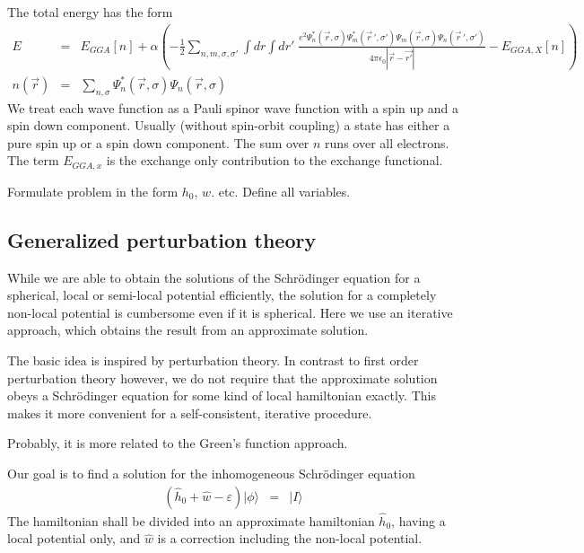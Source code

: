 \documentclass[11pt,a4paper]{report}
\begin{document}
The total energy has the form
\begin{eqnarray*}
E&=&E_{GGA}[n]+\alpha\left(-\frac{1}{2}\sum_{n,m,\sigma,\sigma'}
\int dr\int dr'\;
\frac{e^2\Psi^*_n(\vec{r},\sigma)\Psi^*_m(\vec{r}\,',\sigma')
\Psi_m(\vec{r},\sigma)\Psi_n(\vec{r}\,',\sigma')}{4\pi\epsilon_0|\vec{r}-\vec{r'}|}
-E_{GGA,X}[n]\right)
\\
n(\vec{r})&=&\sum_{n,\sigma}\Psi_n^*(\vec{r},\sigma)\Psi_n(\vec{r},\sigma)
\end{eqnarray*}
We treat each wave function as a Pauli spinor wave function
with a spin up and a spin down component. Usually (without spin-orbit
coupling) a state has either a pure spin up or a spin down component.
The sum over $n$ runs over all electrons.
The term $E_{GGA,x}$ is the exchange only contribution to the exchange
functional.

Formulate problem in the form $h_0$, $w$. etc. Define all variables.
\subsection{Generalized perturbation theory}
\label{sec:gpt}
While we are able to obtain the solutions of the Schr\"odinger
equation for a spherical, local or semi-local potential efficiently,
the solution for a completely non-local potential is cumbersome even
if it is spherical. Here we use an iterative approach, which obtains
the result from an approximate solution. 

The basic idea is inspired by perturbation theory.  In contrast to
first order perturbation theory however, we do not require that the
approximate solution obeys a Schr\"odinger equation for some kind of
local hamiltonian exactly. This makes it more convenient for a
self-consistent, iterative procedure.

Probably, it is more related to the Green's function approach.

Our goal is to find a solution for the inhomogeneous Schr\"odinger
equation
\begin{eqnarray*}
\left(\hat{h}_0+\hat{w}-\varepsilon\right)
|\phi\rangle&=&|I\rangle
\end{eqnarray*}
The hamiltonian shall be divided into an approximate hamiltonian
$\hat{h}_0$, having a local potential only, and $\hat{w}$ is a
correction including the non-local potential.
\end{document}
